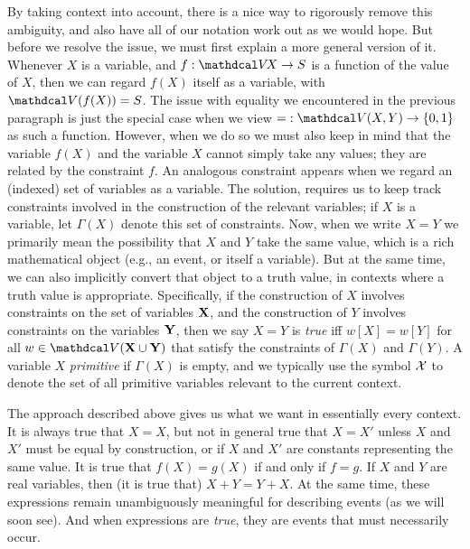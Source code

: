 By taking context into account, there is a nice way to rigorously remove this ambiguity, and also have all of our notation work out as we would hope. 
But before we resolve the issue, we must first explain a more general version of it. 
Whenever $X$ is a variable, and $f : \V\!X \to S$ is a function of the value of $X$, then we can regard $f(X)$ itself as a variable, with $\V(f(X)) = S$. 
The issue with equality we encountered in the previous paragraph is just the special case when we view ${=} : \V(X,Y) \to \{0,1\}$ as such a function. 
%
However, when we do so we must also keep in mind that the variable $f(X)$ and the variable $X$ cannot simply take any values; they are related by the constraint $f$. 
An analogous constraint appears when we regard an (indexed) set of variables as a variable.
The solution, requires us to keep track constraints involved in the construction of the relevant variables; 
if $X$ is a variable, let $\Gamma(X)$ denote this set of constraints. 
%
Now, when we write $X = Y$ we primarily mean the possibility that $X$ and $Y$ take the same value, which is a rich mathematical object (e.g., an event, or itself a variable). 
But at the same time, we can also implicitly convert that object to a truth value, in contexts where a truth value is appropriate.
Specifically, 
if the construction of $X$ involves constraints on the set of variables $\mathbf X$, and the construction of $Y$ involves constraints on the variables $\mathbf Y$, 
then we say $X{=}Y$ is \emph{true} iff $w[X] = w[Y]$ for all $w \in \V(\mat X \cup \mat Y)$ that satisfy the constraints of $\Gamma(X)$ and $\Gamma(Y)$.
A variable $X$ \emph{primitive} if $\Gamma(X)$ is empty, and we typically use the symbol $\mathcal X$ to denote the set of all primitive variables relevant to the current context.

The approach described above gives us what we want in essentially every context. 
It is always true that $X = X$, but not in general true that $X = X'$ unless $X$ and $X'$ must be equal by construction, or if $X$ and $X'$ are constants representing the same value. 
It is true that $f(X) = g(X)$ if and only if $f = g$.
If $X$ and $Y$ are real variables, then (it is true that) $X + Y = Y + X$.
At the same time, these expressions remain unambiguously meaningful for describing events (as we will soon see). And when expressions are \emph{true}, they are events that must necessarily occur.


